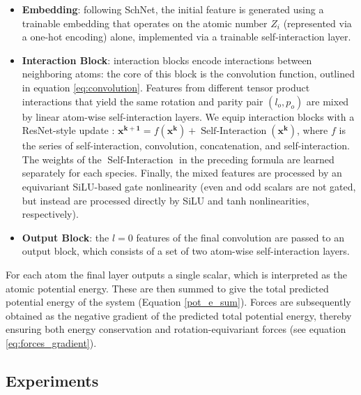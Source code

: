 \documentclass[11pt]{article}
\begin{document}
\begin{itemize}
    \item \textbf{Embedding}: following SchNet, the initial feature is generated using a trainable embedding that operates on the atomic number $Z_i$ (represented via a one-hot encoding) alone, implemented via a trainable self-interaction layer. 
    \item \textbf{Interaction Block}: interaction blocks encode interactions between neighboring atoms: the core of this block is the convolution function, outlined in equation \ref{eq:convolution}. Features from different tensor product interactions that yield the same rotation and parity pair $(l_o, p_o)$ are mixed by linear atom-wise self-interaction layers. We equip interaction blocks with a ResNet-style update \cite{he2016deep}: $\mathbf{x^{k+1}} = f(\mathbf{x^k}) + \operatorname{Self-Interaction}(\mathbf{x^k})$, where $f$ is the series of self-interaction, convolution, concatenation, and self-interaction. The weights of the $\operatorname{Self-Interaction}$ in the preceding formula are learned separately for each species. Finally, the mixed features are processed by an equivariant SiLU-based gate nonlinearity \cite{hendrycks2016gaussian, weiler20183d} (even and odd scalars are not gated, but instead are processed directly by SiLU and tanh nonlinearities, respectively). 
    
    \item \textbf{Output Block}: the $l=0$ features of the final convolution are passed to an output block, which consists of a set of two atom-wise self-interaction layers.
\end{itemize}

For each atom the final layer outputs a single scalar, which is interpreted as the atomic potential energy. These are then summed to give the total predicted potential energy of the system (Equation \ref{pot_e_sum}). Forces are subsequently obtained as the negative gradient of the predicted total potential energy, thereby ensuring both energy conservation and rotation-equivariant forces (see equation \ref{eq:forces_gradient}).  

\subsection{Experiments}
\end{document}
